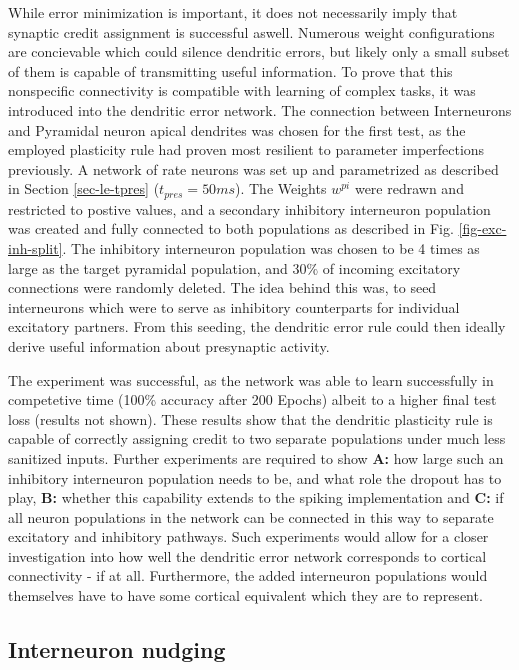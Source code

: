 While error minimization is important, it does not necessarily imply that synaptic credit assignment is successful
aswell. Numerous weight configurations are concievable which could silence dendritic errors, but likely only a small
subset of them is capable of transmitting useful information. To prove that this nonspecific connectivity is compatible
with learning of complex tasks, it was introduced into the dendritic error network. The connection between Interneurons
and Pyramidal neuron apical dendrites was chosen for the first test, as the employed plasticity rule had proven most
resilient to parameter imperfections previously. A network of rate neurons was set up and parametrized as described in
Section \ref{sec-le-tpres} ($t_{pres}= 50ms$). The Weights $w^{pi}$ were redrawn and restricted to postive values, and a
secondary inhibitory interneuron population was created and fully connected to both populations as described in Fig.
\ref{fig-exc-inh-split}. The inhibitory interneuron population was chosen to be 4 times as large as the target pyramidal
population, and $30\%$ of incoming excitatory connections were randomly deleted. The idea behind this was, to seed
interneurons which were to serve as inhibitory counterparts for individual excitatory partners. From this seeding, the
dendritic error rule could then ideally derive useful information about presynaptic activity.

The experiment was successful, as the network was able to learn successfully in competetive time (100\% accuracy after
200 Epochs) albeit to a higher final test loss (results not shown). These results show that the dendritic plasticity
rule is capable of correctly assigning credit to two separate populations under much less sanitized inputs. Further
experiments are required to show \textbf{A:} how large such an inhibitory interneuron population needs to be, and what
role the dropout has to play, \textbf{B:} whether this capability extends to the spiking implementation and \textbf{C:}
if all neuron populations in the network can be connected in this way to separate excitatory and inhibitory pathways. 
Such experiments would allow for a closer investigation into how well the dendritic error network corresponds to 
cortical connectivity - if at all. Furthermore, the added interneuron populations would themselves have to have
some cortical equivalent which they are to represent.


\subsection{Interneuron nudging}

